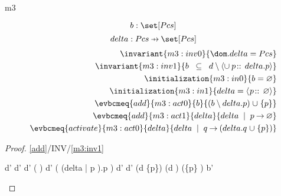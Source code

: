 \documentclass[12pt]{amsart}
\begin{document}
\begin{machine}{m3}

	\[ \variable{b : \set[Pcs]} \]
	\[ \variable{delta : Pcs \pfun \set [Pcs]} \]
\begin{align}
	\invariant{m3:inv0}{ \dom.delta = Pcs } \\
	\invariant{m3:inv1}{ b \2\subseteq d \setminus 
		\qunion{p}{}{delta.p} } \\
	\initialization{m3:in0}{ b = \emptyset } \\
	\initialization{m3:in1}{ delta = \qfun{p}{}{\emptyset} } \\
	\evbcmeq{add}{m3:act0}{b}{(b\setminus delta.p) \bunion \{p\}} \\
	\evbcmeq{add}{m3:act1}{delta}{delta \2| p \fun \emptyset }  \\
	\evbcmeq{activate}{m3:act0}{delta}{delta \2| q \fun (delta.q \bunion \{p\})}
\end{align}
\begin{proof}{\ref{add}/INV/\ref{m3:inv1}}
\begin{calculation}
	d' \setminus {}
\hint{=}{ \eqref{m3:act1} }
	d' \setminus {}
	d' \setminus (
	 \bunion 
	)
	d' \setminus (
	 (delta \1| p \fun \emptyset).p \bunion 
	)
	d' \setminus 
	d' \setminus 
\hint{=}{ \eqref{m2:act0} }
	(d \bunion \{p\}) \setminus {}
	(d \setminus {})
	 \bunion (\{p\} \setminus {})
\hint{\supseteq}{}
	b'
\end{calculation}
\end{proof}
\end{machine}
\end{document}
